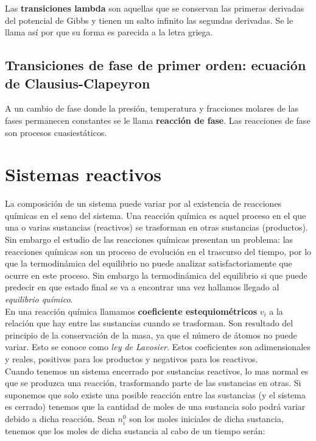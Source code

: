 \documentclass[12pt]{book}
\begin{document}
Las \textbf{transiciones lambda} son aquellas que se conservan las primeras derivadas del potencial de Gibbs y tienen un salto infinito las segundas derivadas. Se le llama así por que su forma es parecida a la letra griega.


\section{Transiciones de fase de primer orden: ecuación de Clausius-Clapeyron}

A un cambio de fase donde la presión, temperatura y fracciones molares de las fases permanecen constantes se le llama \textbf{reacción de fase}. Las reacciones de fase son procesos cuasiestáticos. 


\chapter{Sistemas reactivos}

La composición de un sistema puede variar por al existencia de reacciones químicas en el seno del sistema. Una reacción química es aquel proceso en el que una o varias sustancias (reactivos) se trasforman en otras sustancias (productos). Sin embargo el estudio de las reacciones químicas presentan un problema: las reacciones químicas son un proceso de evolución en el trascurso del tiempo, por lo que la termodinámica del equilibrio no puede analizar satisfactoriamente que ocurre en este proceso. Sin embargo la termodinámica del equilibrio si que puede predecir en que estado final se va a encontrar una vez hallamos llegado al \textit{equilibrio químico}. \\

En una reacción química llamamos \textbf{coeficiente estequiométricos} $v_i$ a la relación que hay entre las sustancias cuando se trasforman. Son resultado del principio de la conservación de la masa, ya que el número de átomos no puede variar. Esto se conoce como \textit{ley de Lavosier}. Estos coeficientes son adimensionales y reales, positivos para los productos y negativos para los reactivos. \\

Cuando tenemos un sistema encerrado por sustancias reactivos, lo mas normal es que se produzca una reacción, trasformando parte de las sustancias en otras. Si suponemos que solo existe una posible reacción entre las sustancias (y el sistema es cerrado) tenemos que la cantidad de moles de una sustancia solo podrá variar debido a dicha reacción. Sean $n_i^0$ son los moles iniciales de dicha sustancia, tenemos que los moles de dicha sustancia al cabo de un tiempo serán:
\end{document}
